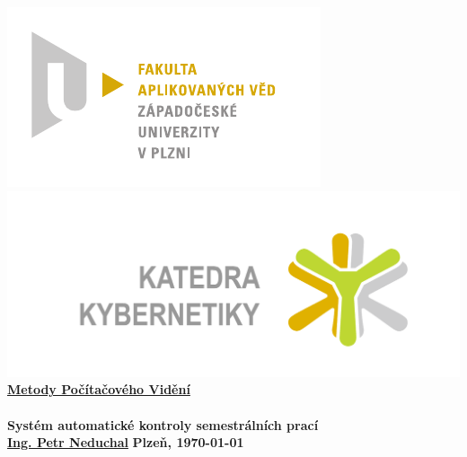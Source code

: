 \documentclass[12pt, a4paper]{article}
\newcommand{\cisloZadani}{Systém automatické kontroly semestrálních prací}
\begin{document}
 









 
\begin{titlepage}
\begin{center}
	\includegraphics[trim = 0.6cm 0.5cm 0.9cm 0.5cm, scale=1]{./FAV_logo_cz.pdf}
	\hspace*{\fill}
	\includegraphics[trim = 3.5cm 1.5cm 2.6cm 2cm, scale=0.295]{./KKY_logo_cz.pdf}\\
	\vspace*{\fill}
	\textbf{\Huge{\href{http://www.kky.zcu.cz/cs/courses/mpv}{Metody Počítačového Vidění} \\ ~ \\ \cisloZadani}}\\
	\vspace*{\fill}
	\textbf{\large{\href{mailto:neduchal@kky.zcu.cz}{Ing. Petr Neduchal}}} \hfill \textbf{\large{Plzeň, \today}}
\end{center}
\end{titlepage}







\end{document}
